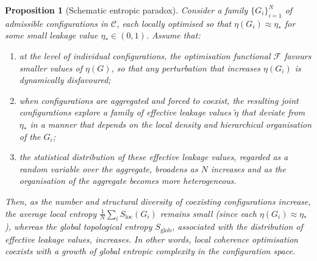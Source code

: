 \documentclass[11pt,a4paper]{article}
\newtheorem{proposition}[theorem]{Proposition}
\theoremstyle{definition}
\newcommand{\Fopt}{\mathcal{F}} %
\newcommand{\Cconf}{\mathcal{C}} %
\begin{document}
\begin{proposition}[Schematic entropic paradox]
Consider a family \(\{G_i\}_{i=1}^N\) of admissible configurations in \(\Cconf\), each locally optimised so that \(\eta(G_i) \approx \eta_{\ast}\) for some small leakage value \(\eta_{\ast} \in (0,1)\). Assume that:
\begin{enumerate}[label=(\alph*)]
\item at the level of individual configurations, the optimisation functional \(\Fopt\) favours smaller values of \(\eta(G)\), so that any perturbation that increases \(\eta(G_i)\) is dynamically disfavoured;
\item when configurations are aggregated and forced to coexist, the resulting joint configurations explore a family of effective leakage values \(\tilde{\eta}\) that deviate from \(\eta_{\ast}\) in a manner that depends on the local density and hierarchical organisation of the \(G_i\);
\item the statistical distribution of these effective leakage values, regarded as a random variable over the aggregate, broadens as \(N\) increases and as the organisation of the aggregate becomes more heterogeneous.
\end{enumerate}
Then, as the number and structural diversity of coexisting configurations increase, the average local entropy \(\frac{1}{N}\sum_i S_{\mathrm{loc}}(G_i)\) remains small (since each \(\eta(G_i) \approx \eta_{\ast}\)), whereas the global topological entropy \(S_{\mathrm{glob}}\), associated with the distribution of effective leakage values, increases. In other words, local coherence optimisation coexists with a growth of global entropic complexity in the configuration space.
\end{proposition}
\end{document}
